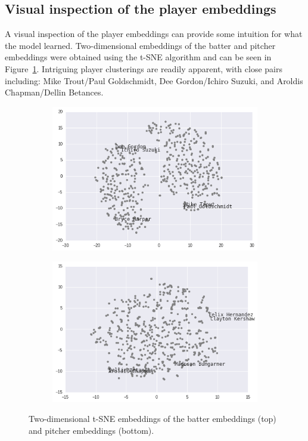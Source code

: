 \documentclass{article}
\begin{document}
\subsection{Visual inspection of the player embeddings}

A visual inspection of the player embeddings can provide some intuition for what the model learned. Two-dimensional embeddings of the batter and pitcher embeddings were obtained using the t-SNE algorithm \parencite{VanderMaaten2008} and can be seen in Figure~\ref{fig:tsne}. Intriguing player clusterings are readily apparent, with close pairs including: Mike Trout/Paul Goldschmidt, Dee Gordon/Ichiro Suzuki, and Aroldis Chapman/Dellin Betances.

\begin{figure}
\captionsetup[subfigure]{labelformat=empty}
\centering

    \begin{subfigure}[b]{0.75\textwidth}
    \includegraphics[width=1\linewidth]{batter_tsne.png}
    \caption{}
    \end{subfigure}

    \begin{subfigure}[b]{0.75\textwidth}
    \includegraphics[width=1\linewidth]{pitcher_tsne.png}
    \caption{}
    \end{subfigure}

\caption{Two-dimensional t-SNE embeddings of the batter embeddings (top) and pitcher embeddings (bottom).}
\label{fig:tsne}
\end{figure}
\end{document}
